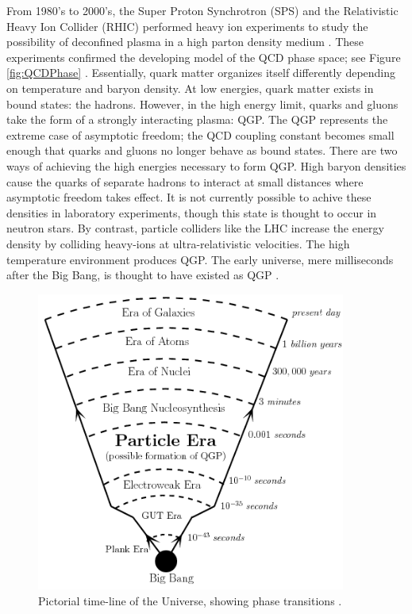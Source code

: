 From 1980's to 2000's, the Super Proton Synchrotron (SPS) and the Relativistic Heavy Ion Collider (RHIC) performed heavy ion experiments to study the possibility of deconfined plasma in a high parton density medium \cite{spsHI,ags2rhic,etaOvSinit}. These experiments confirmed the developing model of the QCD phase space; see Figure \ref{fig:QCDPhase} \cite{Bhalerao:1695331}. Essentially, quark matter organizes itself differently depending on temperature and baryon density. At low energies, quark matter exists in bound states: the hadrons. However, in the high energy limit, quarks and gluons take the form of a strongly interacting plasma: QGP. The QGP represents the extreme case of asymptotic freedom; the QCD coupling constant becomes small enough that quarks and gluons no longer behave as bound states. There are two ways of achieving the high energies necessary to form QGP. High baryon densities cause the quarks of separate hadrons to interact at small distances where asymptotic freedom takes effect. It is not currently possible to achive these densities in laboratory experiments, though this state is thought to occur in neutron stars. By contrast, particle colliders like the LHC increase the energy density by colliding heavy-ions at ultra-relativistic velocities. The high temperature environment produces QGP. The early universe, mere milliseconds after the Big Bang, is thought to have existed as QGP \cite{Hands:2001ve}.


\begin{figure}[h!]
\begin{centering}
\includegraphics[width=4in]{Chapter1/importfigs/fig_bb_timeline.png}
\par\end{centering}
\caption{Pictorial time-line of the Universe, showing phase transitions \cite{Bandyopadhyay:2017wip}. \label{fig:history}}
\end{figure}

